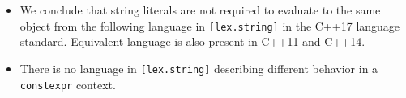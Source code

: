 \begin{itemize}
    \item We conclude that string literals are not required to evaluate to the same object from the following language in \texttt{[lex.string]} in the C++17 language standard. Equivalent language is also present in C++11 and C++14.
    \item There is no language in \texttt{[lex.string]} describing different behavior in a \texttt{constexpr} context.
\end{itemize}
